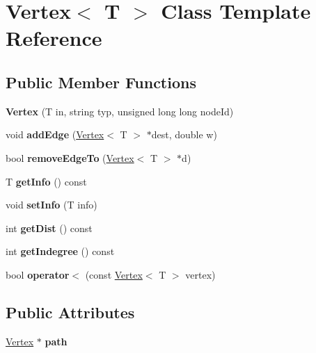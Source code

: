 \hypertarget{class_vertex}{}\section{Vertex$<$ T $>$ Class Template Reference}
\label{class_vertex}
\subsection*{Public Member Functions}
\begin{DoxyCompactItemize}
\item 
\hypertarget{class_vertex_a8898f3b399880a39ff8f37b3eaf50f57}{}\label{class_vertex_a8898f3b399880a39ff8f37b3eaf50f57} 
{\bfseries Vertex} (T in, string typ, unsigned long long node\+Id)
\item 
\hypertarget{class_vertex_aeb024eced2da142912f189af6a454db3}{}\label{class_vertex_aeb024eced2da142912f189af6a454db3} 
void {\bfseries add\+Edge} (\hyperlink{class_vertex}{Vertex}$<$ T $>$ $\ast$dest, double w)
\item 
\hypertarget{class_vertex_ab2b5b43fb1709a901b78718436763a84}{}\label{class_vertex_ab2b5b43fb1709a901b78718436763a84} 
bool {\bfseries remove\+Edge\+To} (\hyperlink{class_vertex}{Vertex}$<$ T $>$ $\ast$d)
\item 
\hypertarget{class_vertex_a48eae2f7af2362634adab02b7b2dbec6}{}\label{class_vertex_a48eae2f7af2362634adab02b7b2dbec6} 
T {\bfseries get\+Info} () const
\item 
\hypertarget{class_vertex_a31cd60c26640f8072a928ba70eb2f95e}{}\label{class_vertex_a31cd60c26640f8072a928ba70eb2f95e} 
void {\bfseries set\+Info} (T info)
\item 
\hypertarget{class_vertex_a645a81161bc9f70ebfda8e292b91c24b}{}\label{class_vertex_a645a81161bc9f70ebfda8e292b91c24b} 
int {\bfseries get\+Dist} () const
\item 
\hypertarget{class_vertex_ac78980191ea1f9d22e6617e9e511b755}{}\label{class_vertex_ac78980191ea1f9d22e6617e9e511b755} 
int {\bfseries get\+Indegree} () const
\item 
\hypertarget{class_vertex_a7091b26f281a5041b1775a3d3f9cb7a6}{}\label{class_vertex_a7091b26f281a5041b1775a3d3f9cb7a6} 
bool {\bfseries operator$<$} (const \hyperlink{class_vertex}{Vertex}$<$ T $>$ vertex)
\end{DoxyCompactItemize}
\subsection*{Public Attributes}
\begin{DoxyCompactItemize}
\item 
\hypertarget{class_vertex_abd40febd917aa25add6bd42237c8463a}{}\label{class_vertex_abd40febd917aa25add6bd42237c8463a} 
\hyperlink{class_vertex}{Vertex} $\ast$ {\bfseries path}
\end{DoxyCompactItemize}

